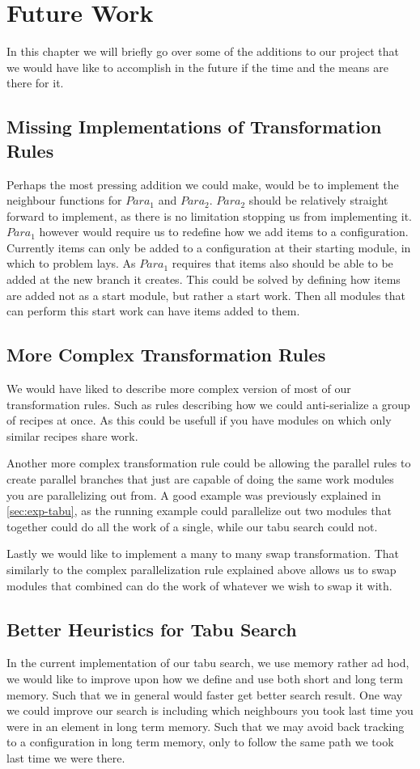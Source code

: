 \chapter{Future Work}
In this chapter we will briefly go over some of the additions to our project that we would have like to accomplish in the future if the time and the means are there for it.


\section{Missing Implementations of Transformation Rules}
Perhaps the most pressing addition we could make, would be to implement the neighbour functions for $Para_1$ and $Para_2$. $Para_2$ should be relatively straight forward to implement, as there is no limitation stopping us from implementing it. $Para_1$ however would require us to redefine how we add items to a configuration. Currently items can only be added to a configuration at their starting module, in which to problem lays. As $Para_1$ requires that items also should be able to be added at the new branch it creates. This could be solved by defining how items are added not as a start module, but rather a start work. Then all modules that can perform this start work can have items added to them.

\section{More Complex Transformation Rules}
We would have liked to describe more complex version of most of our transformation rules. Such as rules describing how we could anti-serialize a group of recipes at once. As this could be usefull if you have modules on which only similar recipes share work.

Another more complex transformation rule could be allowing the parallel rules to create parallel branches that just are capable of doing the same work modules you are parallelizing out from. A good example was previously explained in \cref{sec:exp-tabu}, as the running example could parallelize out two modules that together could do all the work of a single, while our tabu search could not.

Lastly we would like to implement a many to many swap transformation. That similarly to the complex parallelization rule explained above allows us to swap modules that combined can do the work of whatever we wish to swap it with.

\section{Better Heuristics for Tabu Search}
In the current implementation of our tabu search, we use memory rather ad hod, we would like to improve upon how we define and use both short and long term memory. Such that we in general would faster get better search result. One way we could improve our search is including which neighbours you took last time you were in an element in long term memory. Such that we may avoid back tracking to a configuration in long term memory, only to follow the same path we took last time we were there. 

 



